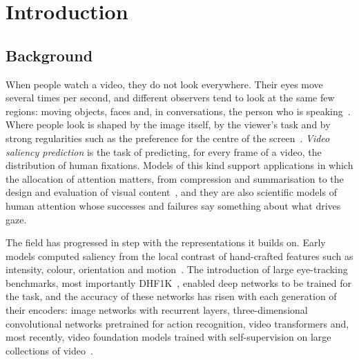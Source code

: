 \chapter{Introduction}\label{ch:introduction}

\section{Background}\label{sec:background}


When people watch a video, they do not look everywhere. Their eyes move several
times per second, and different observers tend to look at the same few regions:
moving objects, faces and, in conversations, the person who is
speaking~\cite{mital2011clustering,coutrot2014how}. Where people look is shaped
by the image itself, by the viewer's task and by strong regularities such as
the preference for the centre of the
screen~\cite{itti2001computational,borji2013state,tseng2009quantifying}.
\emph{Video saliency prediction} is the task of predicting, for every frame of a
video, the distribution of human fixations. Models of this kind support
applications in which the allocation of attention matters, from compression and
summarisation to the design and evaluation of visual
content~\cite{borji2021saliency}, and they are also scientific models of human
attention whose successes and failures say something about what drives gaze.

The field has progressed in step with the representations it builds on. Early
models computed saliency from the local contrast of hand-crafted features such
as intensity, colour, orientation and motion~\cite{itti1998model}. The
introduction of large eye-tracking benchmarks, most importantly
DHF1K~\cite{wang2018revisiting,wang2021revisiting}, enabled deep networks to be
trained for the task, and the accuracy of these networks has risen with each
generation of their encoders: image networks with recurrent layers,
three-dimensional convolutional networks pretrained for action recognition,
video transformers and, most recently, video foundation models trained with
self-supervision on large collections of video~\cite{moradi2024salfom}.

